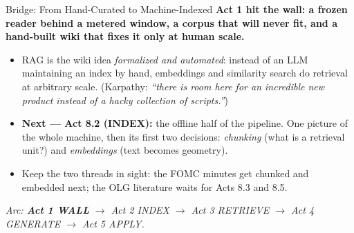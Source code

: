 \begin{frame}{Bridge: From Hand-Curated to Machine-Indexed}
\textbf{Act 1 hit the wall: a frozen reader behind a metered window, a corpus that will never fit, and a hand-built wiki that fixes it only at human scale.}

\medskip
\begin{itemize}
\item RAG is the wiki idea \emph{formalized and automated}: instead of an LLM maintaining an index by hand, embeddings and similarity search do retrieval at arbitrary scale. (Karpathy: \emph{``there is room here for an incredible new product instead of a hacky collection of scripts.''})

\medskip
\item \textbf{Next --- Act 8.2 (INDEX):} the offline half of the pipeline. One picture of the whole machine, then its first two decisions: \emph{chunking} (what is a retrieval unit?) and \emph{embeddings} (text becomes geometry).

\medskip
\item Keep the two threads in sight: the FOMC minutes get chunked and embedded next; the OLG literature waits for Acts 8.3 and 8.5.
\end{itemize}

\bigskip
\centering
\footnotesize\textit{Arc: \textbf{Act 1 WALL} $\to$ Act 2 INDEX $\to$ Act 3 RETRIEVE $\to$ Act 4 GENERATE $\to$ Act 5 APPLY.}
\end{frame}


